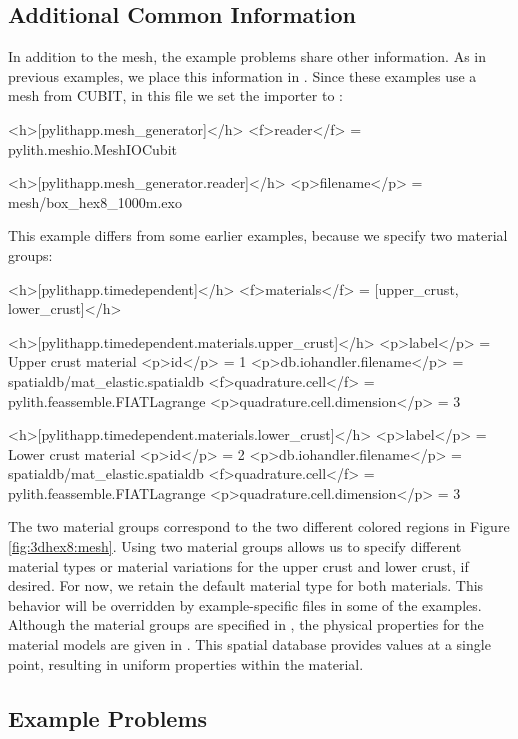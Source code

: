 \subsection{Additional Common Information}

In addition to the mesh, the example problems share other information.
As in previous examples, we place this information in .
Since these examples use a mesh from CUBIT, in this file we set the
importer to :
\begin{cfg}
<h>[pylithapp.mesh_generator]</h>
<f>reader</f> = pylith.meshio.MeshIOCubit

<h>[pylithapp.mesh_generator.reader]</h>
<p>filename</p> = mesh/box_hex8_1000m.exo
\end{cfg}
This example differs from some earlier examples, because we specify
two material groups:
\begin{cfg}
<h>[pylithapp.timedependent]</h>
<f>materials</f> = [upper_crust, lower_crust]</h>

<h>[pylithapp.timedependent.materials.upper_crust]</h>
<p>label</p> = Upper crust material
<p>id</p> = 1
<p>db.iohandler.filename</p> = spatialdb/mat_elastic.spatialdb
<f>quadrature.cell</f> = pylith.feassemble.FIATLagrange
<p>quadrature.cell.dimension</p> = 3

<h>[pylithapp.timedependent.materials.lower_crust]</h>
<p>label</p> = Lower crust material
<p>id</p> = 2
<p>db.iohandler.filename</p> = spatialdb/mat\_elastic.spatialdb
<f>quadrature.cell</f> = pylith.feassemble.FIATLagrange
<p>quadrature.cell.dimension</p> = 3
\end{cfg}
The two material groups correspond to the two different colored regions
in Figure \vref{fig:3dhex8:mesh}. Using two material groups allows
us to specify different material types or material variations for
the upper crust and lower crust, if desired. For now, we retain the
default  material type for both materials.
This behavior will be overridden by example-specific 
files in some of the examples. Although the material groups are specified
in , the physical properties for the material
models are given in  
. This spatial database provides values
at a single point, resulting in uniform properties within the material.


\subsection{Example Problems}

